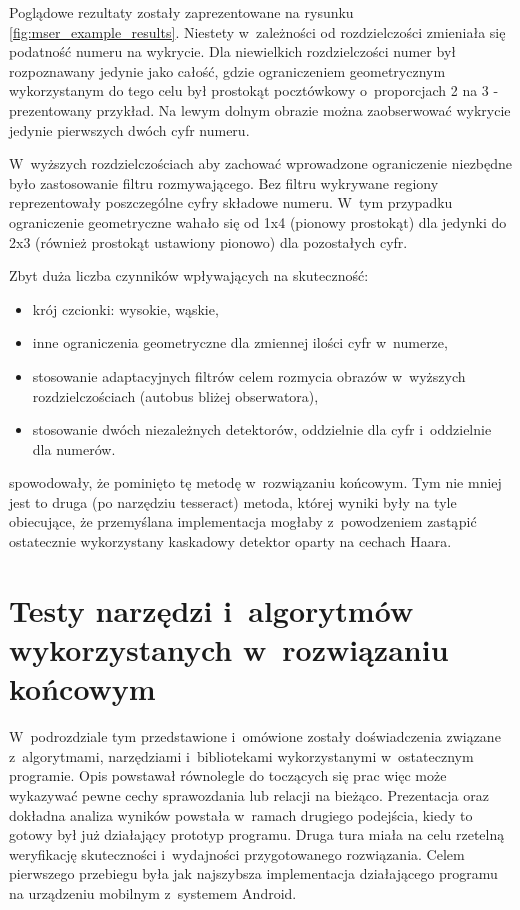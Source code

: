 Poglądowe rezultaty zostały zaprezentowane na rysunku
\ref{fig:mser_example_results}.
Niestety w~zależności od rozdzielczości zmieniała się podatność
numeru na wykrycie. Dla niewielkich rozdzielczości numer był rozpoznawany
jedynie jako całość, gdzie ograniczeniem geometrycznym wykorzystanym
do tego celu był prostokąt pocztówkowy o~proporcjach 2 na 3 - prezentowany
przykład. Na lewym dolnym obrazie można zaobserwować wykrycie jedynie
pierwszych dwóch cyfr numeru.

W~wyższych rozdzielczościach aby zachować wprowadzone ograniczenie
niezbędne było zastosowanie filtru rozmywającego. Bez filtru
wykrywane regiony reprezentowały poszczególne cyfry składowe numeru.
W~tym przypadku ograniczenie geometryczne wahało się od 1x4 (pionowy
prostokąt) dla jedynki do 2x3 (również prostokąt ustawiony pionowo) dla
pozostałych cyfr.

Zbyt duża liczba czynników wpływających na skuteczność:

\begin{itemize}
    \item krój czcionki: wysokie, wąskie,
    \item inne ograniczenia geometryczne dla zmiennej ilości cyfr
        w~numerze,
    \item stosowanie adaptacyjnych filtrów celem rozmycia obrazów
        w~wyższych rozdzielczościach (autobus bliżej obserwatora),
    \item stosowanie dwóch niezależnych detektorów, oddzielnie dla
        cyfr i~oddzielnie dla numerów.
\end{itemize}

spowodowały, że pominięto tę metodę w~rozwiązaniu końcowym.
Tym nie mniej jest to druga (po narzędziu tesseract) metoda, której
wyniki były na tyle obiecujące, że przemyślana implementacja
mogłaby z~powodzeniem zastąpić ostatecznie wykorzystany kaskadowy
detektor oparty na cechach Haara.


\section{Testy narzędzi i~algorytmów wykorzystanych w~rozwiązaniu 
	końcowym}

W~podrozdziale tym przedstawione i~omówione zostały doświadczenia
związane z~algorytmami, narzędziami i~bibliotekami wykorzystanymi
w~ostatecznym programie. Opis powstawał równolegle
do toczących się prac więc może wykazywać pewne cechy sprawozdania
lub relacji na bieżąco.
Prezentacja oraz dokładna analiza wyników powstała w~ramach
drugiego podejścia, kiedy to gotowy był już działający prototyp programu.
Druga tura miała na celu rzetelną weryfikację skuteczności
i~wydajności przygotowanego rozwiązania.
Celem pierwszego przebiegu była jak najszybsza implementacja
działającego programu na urządzeniu mobilnym z~systemem Android.

